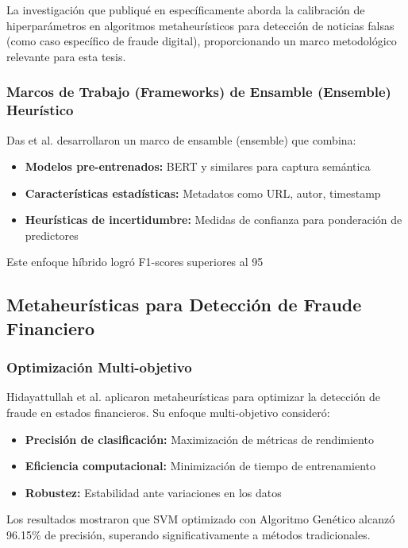 La investigación que publiqué en \cite{hurtado2024calibracion} específicamente aborda la calibración de hiperparámetros en algoritmos metaheurísticos para detección de noticias falsas (como caso específico de fraude digital), proporcionando un marco metodológico relevante para esta tesis.

\subsubsection{Marcos de Trabajo (Frameworks) de Ensamble (Ensemble) Heurístico}

Das et al. \cite{das2022heuristic} desarrollaron un marco de ensamble (ensemble) que combina:
\begin{itemize}
    \item \textbf{Modelos pre-entrenados:} BERT y similares para captura semántica
    \item \textbf{Características estadísticas:} Metadatos como URL, autor, timestamp
    \item \textbf{Heurísticas de incertidumbre:} Medidas de confianza para ponderación de predictores
\end{itemize}

Este enfoque híbrido logró F1-scores superiores al 95%

\subsection{Metaheurísticas para Detección de Fraude Financiero}

\subsubsection{Optimización Multi-objetivo}

Hidayattullah et al. \cite{hidayattullah2020financial} aplicaron metaheurísticas para optimizar la detección de fraude en estados financieros. Su enfoque multi-objetivo consideró:
\begin{itemize}
    \item \textbf{Precisión de clasificación:} Maximización de métricas de rendimiento
    \item \textbf{Eficiencia computacional:} Minimización de tiempo de entrenamiento
    \item \textbf{Robustez:} Estabilidad ante variaciones en los datos
\end{itemize}

Los resultados mostraron que SVM optimizado con Algoritmo Genético alcanzó 96.15\% de precisión, superando significativamente a métodos tradicionales.

